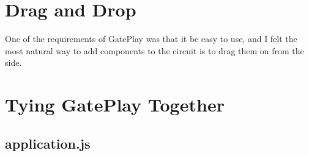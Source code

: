 \section{Drag and Drop}
One of the requirements of GatePlay was that it be easy to use, and I felt the most natural way to add components to the circuit is to drag them on from the side.

\section{Tying GatePlay Together}

\subsection{application.js}
